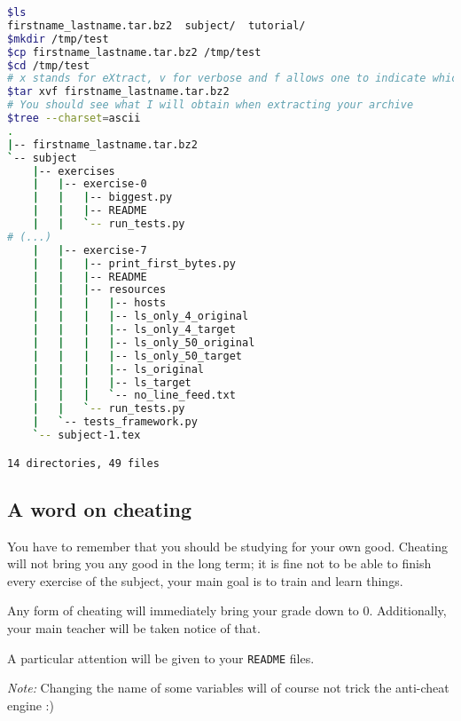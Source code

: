 \documentclass[12pt]{article}
\begin{document}
\begin{lstlisting}[language=bash]
$ls
firstname_lastname.tar.bz2  subject/  tutorial/
$mkdir /tmp/test
$cp firstname_lastname.tar.bz2 /tmp/test
$cd /tmp/test
# x stands for eXtract, v for verbose and f allows one to indicate which file tar should work with
$tar xvf firstname_lastname.tar.bz2
# You should see what I will obtain when extracting your archive
$tree --charset=ascii
.
|-- firstname_lastname.tar.bz2
`-- subject
    |-- exercises
    |   |-- exercise-0
    |   |   |-- biggest.py
    |   |   |-- README
    |   |   `-- run_tests.py
# (...)
    |   |-- exercise-7
    |   |   |-- print_first_bytes.py
    |   |   |-- README
    |   |   |-- resources
    |   |   |   |-- hosts
    |   |   |   |-- ls_only_4_original
    |   |   |   |-- ls_only_4_target
    |   |   |   |-- ls_only_50_original
    |   |   |   |-- ls_only_50_target
    |   |   |   |-- ls_original
    |   |   |   |-- ls_target
    |   |   |   `-- no_line_feed.txt
    |   |   `-- run_tests.py
    |   `-- tests_framework.py
    `-- subject-1.tex

14 directories, 49 files
\end{lstlisting}

\subsection{A word on cheating}

You have to remember that you should be studying for your own good. Cheating will not bring you any good in the long term; it is fine not to be able to finish every exercise of the subject, your main goal is to train and learn things.

Any form of cheating will immediately bring your grade down to 0. Additionally, your main teacher will be taken notice of that.

A particular attention will be given to your \texttt{README} files.

\textit{Note:} Changing the name of some variables will of course not trick the anti-cheat engine :)
\end{document}

